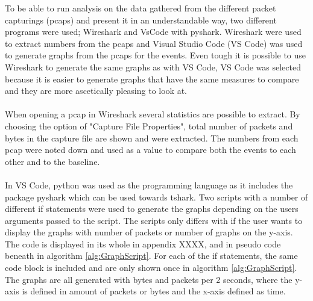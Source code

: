 To be able to run analysis on the data gathered from the different packet capturings (pcaps) and present it in an understandable way, two different programs were used; Wireshark and VsCode with pyshark. Wireshark were used to extract numbers from the pcaps and Visual Studio Code (VS Code) was used to generate graphs from the pcaps for the events. Even tough it is possible to use Wireshark to generate the same graphs as with VS Code, VS Code was selected because it is easier to generate graphs that have the same measures to compare and they are more ascetically pleasing to look at.
\\\\
When opening a pcap in Wireshark several statistics are possible to extract. By choosing the option of "Capture File Properties", total number of packets and bytes in the capture file are shown and were extracted. The numbers from each pcap were noted down and used as a value to compare both the events to each other and to the baseline. 
\\\\
In VS Code, python was used as the programming language as it includes the package pyshark which can be used towards tshark. Two scripts with a number of different if statements were used to generate the graphs depending on the users arguments passed to the script. The scripts only differs with if the user wants to display the graphs with number of packets or number of graphs on the y-axis. The code is displayed in its whole in appendix XXXX, and in pseudo code beneath in algorithm \ref{alg:GraphScript}. For each of the if statements, the same code block is included and are only shown once in algorithm \ref{alg:GraphScript}. The graphs are all generated with bytes and packets per 2 seconds, where the y-axis is defined in amount of packets or bytes and the x-axis defined as time. 

